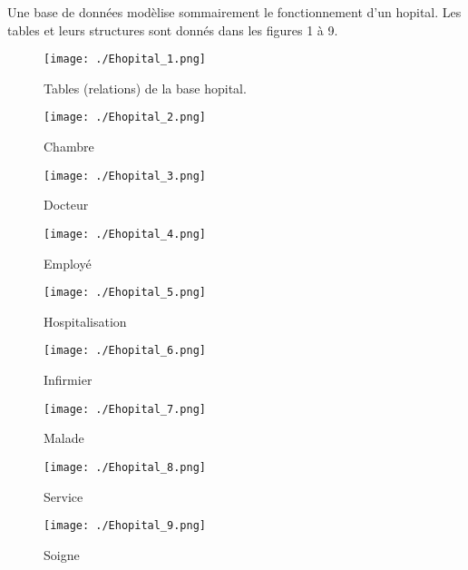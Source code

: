Une base de données modèlise sommairement le fonctionnement d'un hopital. Les tables et leurs structures sont donnés dans les figures 1 à 9.
\begin{figure}[h]
  \centering
  \texttt{[image: ./Ehopital\_1.png]}
  \caption{Tables (relations) de la base \og hopital\fg.}
  \label{fig:hop_1}
\end{figure}
\begin{figure}
 \centering
 \texttt{[image: ./Ehopital\_2.png]}
 \caption{Chambre}
 \label{fig:hop_2}
\end{figure}
\begin{figure}
 \centering
 \texttt{[image: ./Ehopital\_3.png]}
 \caption{Docteur}
 \label{fig:hop_3}
\end{figure}
\begin{figure}
 \centering
 \texttt{[image: ./Ehopital\_4.png]}
 \caption{Employé}
 \label{fig:hop_4}
\end{figure}
\begin{figure}
 \centering
 \texttt{[image: ./Ehopital\_5.png]}
 \caption{Hospitalisation}
 \label{fig:hop_5}
\end{figure}
\begin{figure}
 \centering
 \texttt{[image: ./Ehopital\_6.png]}
 \caption{Infirmier}
 \label{fig:hop_6}
\end{figure}
\begin{figure}
 \centering
 \texttt{[image: ./Ehopital\_7.png]}
 \caption{Malade}
 \label{fig:hop_7}
\end{figure}
\begin{figure}
 \centering
 \texttt{[image: ./Ehopital\_8.png]}
 \caption{Service}
 \label{fig:hop_8}
\end{figure}
\begin{figure}
 \centering
 \texttt{[image: ./Ehopital\_9.png]}
 \caption{Soigne}
 \label{fig:hop_9}
\end{figure}


